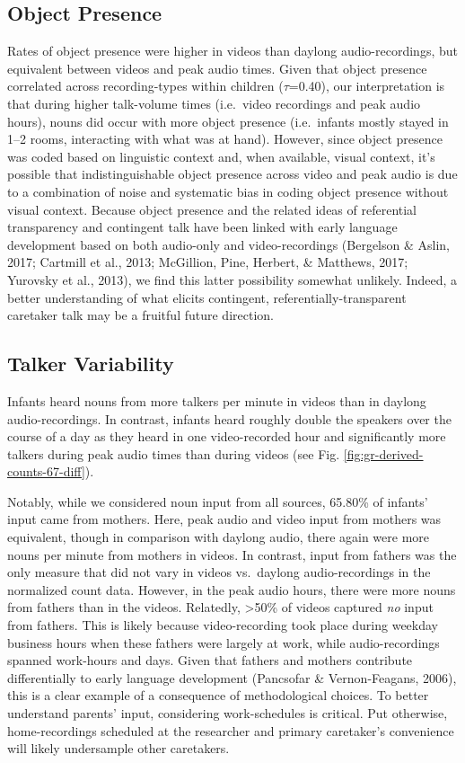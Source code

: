 \documentclass[man]{apa6}
\theoremstyle{definition}
\theoremstyle{definition}
\theoremstyle{definition}
\theoremstyle{remark}
\begin{document}
\subsection{Object Presence}\label{object-presence}

Rates of object presence were higher in videos than daylong
audio-recordings, but equivalent between videos and peak audio times.
Given that object presence correlated across recording-types within
children (\(\tau\)=0.40), our interpretation is that during higher
talk-volume times (i.e.~video recordings and peak audio hours), nouns
did occur with more object presence (i.e.~infants mostly stayed in 1--2
rooms, interacting with what was at hand). However, since object
presence was coded based on linguistic context and, when available,
visual context, it's possible that indistinguishable object presence
across video and peak audio is due to a combination of noise and
systematic bias in coding object presence without visual context.
Because object presence and the related ideas of referential
transparency and contingent talk have been linked with early language
development based on both audio-only and video-recordings (Bergelson \&
Aslin, 2017; Cartmill et al., 2013; McGillion, Pine, Herbert, \&
Matthews, 2017; Yurovsky et al., 2013), we find this latter possibility
somewhat unlikely. Indeed, a better understanding of what elicits
contingent, referentially-transparent caretaker talk may be a fruitful
future direction.

\subsection{Talker Variability}\label{talker-variability}

Infants heard nouns from more talkers per minute in videos than in
daylong audio-recordings. In contrast, infants heard roughly double the
speakers over the course of a day as they heard in one video-recorded
hour and significantly more talkers during peak audio times than during
videos (see Fig. \ref{fig:gr-derived-counts-67-diff}).

Notably, while we considered noun input from all sources, 65.80\% of
infants' input came from mothers. Here, peak audio and video input from
mothers was equivalent, though in comparison with daylong audio, there
again were more nouns per minute from mothers in videos. In contrast,
input from fathers was the only measure that did not vary in videos
vs.~daylong audio-recordings in the normalized count data. However, in
the peak audio hours, there were more nouns from fathers than in the
videos. Relatedly, \textgreater{}50\% of videos captured \emph{no} input
from fathers. This is likely because video-recording took place during
weekday business hours when these fathers were largely at work, while
audio-recordings spanned work-hours and days. Given that fathers and
mothers contribute differentially to early language development
(Pancsofar \& Vernon-Feagans, 2006), this is a clear example of a
consequence of methodological choices. To better understand parents'
input, considering work-schedules is critical. Put otherwise,
home-recordings scheduled at the researcher and primary caretaker's
convenience will likely undersample other caretakers.
\end{document}
